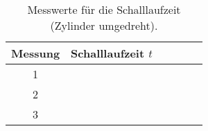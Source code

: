 \begin{table}[H]
  \centering
  \caption{Messwerte für die Schalllaufzeit (Zylinder umgedreht).}
  \label{tab:tab1}
    \begin{tabular}{c c c c c c}
    \toprule
    Messung & Schalllaufzeit $t$\\
    \midrule
    1 &    \\
    2&     \\
    3&     \\

    \bottomrule
    \end{tabular}
  \end{table}
